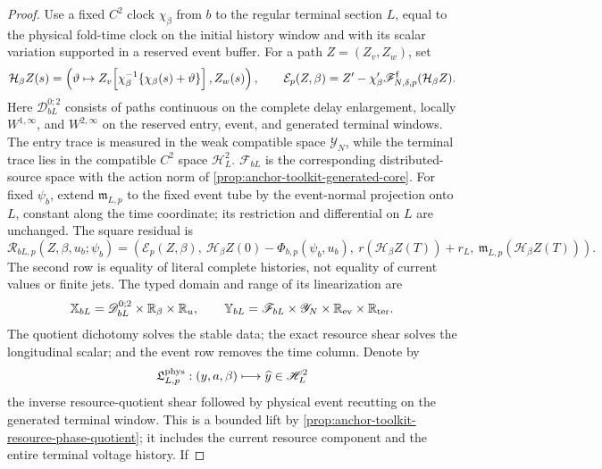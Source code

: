 \begin{proof}
Use a fixed \(C^2\) clock \(\chi_\beta\) from \(b\) to the regular terminal
section \(L\), equal to the physical fold-time clock on the initial history
window and with its scalar variation supported in a reserved event buffer.
For a path \(Z=(Z_v,Z_w)\), set
\[
 \mathcal H_\beta Z(s)
 =\left(\vartheta\mapsto
 Z_v\!\left[\chi_\beta^{-1}
   \{\chi_\beta(s)+\vartheta\}\right],Z_w(s)\right),
 \qquad
 \mathcal E_p(Z,\beta)
 =Z'-\chi_\beta'\mathscr F^{\rm f}_{N,\delta,p}
       (\mathcal H_\beta Z).
\]
Here \(\mathscr D_{bL}^{0;2}\) consists of paths continuous on the complete
delay enlargement, locally \(W^{1,\infty}\), and \(W^{2,\infty}\) on the
reserved entry, event, and generated terminal windows.  The entry trace is
measured in the weak compatible space \(\mathscr Y_N\), while the terminal
trace lies in the compatible \(C^2\) space \(\mathscr H_L^2\).
\(\mathscr F_{bL}\) is the corresponding distributed-source space with the
action norm of \cref{prop:anchor-toolkit-generated-core}.  For fixed
\(\psi_b\), extend \(\mathfrak m_{L,p}\) to the fixed event tube by the
event-normal projection onto \(L\), constant along the time coordinate; its
restriction and differential on \(L\) are unchanged.  The square residual is
\begin{equation}
 \mathscr R_{bL,p}(Z,\beta,u_b;\psi_b)
 =\left(
 \mathcal E_p(Z,\beta),\
 \mathcal H_\beta Z(0)-\Phi_{b,p}(\psi_b,u_b),\
 r(\mathcal H_\beta Z(T))+r_L,\
 \mathfrak m_{L,p}(\mathcal H_\beta Z(T))
 \right).
 \label{eq:lean-anchor-bL-residual}
\end{equation}
The second row is equality of literal complete histories, not equality of
current values or finite jets.  The typed domain and range of its
linearization are
\begin{equation}
 \mathbb X_{bL}=\mathscr D_{bL}^{0;2}
       \times\mathbb R_\beta\times\mathbb R_u,
 \qquad
 \mathbb Y_{bL}=\mathscr F_{bL}\times\mathscr Y_N
       \times\mathbb R_{\rm ev}\times\mathbb R_{\rm ter}.
 \label{eq:lean-anchor-bL-spaces}
\end{equation}
The quotient dichotomy solves the stable data; the exact resource
shear solves the longitudinal scalar; and the event row removes the time
column.  Denote by
\[
 \mathfrak L^{\rm phys}_{L,p}:
  (y,a,\beta)\longmapsto\widehat y\in\mathscr H_L^2
\]
the inverse resource-quotient shear followed by physical event recutting on
the generated terminal window.  This is a bounded lift by
\cref{prop:anchor-toolkit-resource-phase-quotient}; it includes the current
resource component and the entire terminal voltage history.  If

\end{proof}
